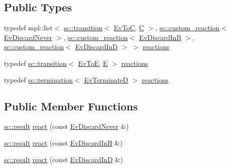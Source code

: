 \subsection*{Public Types}
\begin{DoxyCompactItemize}
\item 
typedef mpl\+::list$<$ \mbox{\hyperlink{classboost_1_1statechart_1_1transition}{sc\+::transition}}$<$ \mbox{\hyperlink{struct_ev_to_c}{Ev\+ToC}}, \mbox{\hyperlink{struct_c}{C}} $>$, \mbox{\hyperlink{classboost_1_1statechart_1_1custom__reaction}{sc\+::custom\+\_\+reaction}}$<$ \mbox{\hyperlink{struct_ev_discard_never}{Ev\+Discard\+Never}} $>$, \mbox{\hyperlink{classboost_1_1statechart_1_1custom__reaction}{sc\+::custom\+\_\+reaction}}$<$ \mbox{\hyperlink{struct_ev_discard_in_b}{Ev\+Discard\+InB}} $>$, \mbox{\hyperlink{classboost_1_1statechart_1_1custom__reaction}{sc\+::custom\+\_\+reaction}}$<$ \mbox{\hyperlink{struct_ev_discard_in_d}{Ev\+Discard\+InD}} $>$ $>$ \mbox{\hyperlink{struct_d_a764cb536c7fd0b2c7008765ad2cea341}{reactions}}
\item 
typedef \mbox{\hyperlink{classboost_1_1statechart_1_1transition}{sc\+::transition}}$<$ \mbox{\hyperlink{struct_ev_to_e}{Ev\+ToE}}, \mbox{\hyperlink{struct_e}{E}} $>$ \mbox{\hyperlink{struct_d_a6f70b78871d2b3343b3d92a9152c12b3}{reactions}}
\item 
typedef \mbox{\hyperlink{classboost_1_1statechart_1_1termination}{sc\+::termination}}$<$ \mbox{\hyperlink{struct_ev_terminate_d}{Ev\+TerminateD}} $>$ \mbox{\hyperlink{struct_d_a754e5c374aa134a2b348c7f0dca8c099}{reactions}}
\end{DoxyCompactItemize}
\subsection*{Public Member Functions}
\begin{DoxyCompactItemize}
\item 
\mbox{\hyperlink{namespaceboost_1_1statechart_abe807f6598b614d6d87bb951ecd92331}{sc\+::result}} \mbox{\hyperlink{struct_d_a001e792488b9baf1e1c0a835961ad5b8}{react}} (const \mbox{\hyperlink{struct_ev_discard_never}{Ev\+Discard\+Never}} \&)
\item 
\mbox{\hyperlink{namespaceboost_1_1statechart_abe807f6598b614d6d87bb951ecd92331}{sc\+::result}} \mbox{\hyperlink{struct_d_a975ef2b8a62e2b68e9af3640aa8d99b9}{react}} (const \mbox{\hyperlink{struct_ev_discard_in_b}{Ev\+Discard\+InB}} \&)
\item 
\mbox{\hyperlink{namespaceboost_1_1statechart_abe807f6598b614d6d87bb951ecd92331}{sc\+::result}} \mbox{\hyperlink{struct_d_a34f2b339213d50b9b7b56389068d7140}{react}} (const \mbox{\hyperlink{struct_ev_discard_in_d}{Ev\+Discard\+InD}} \&)
\end{DoxyCompactItemize}
